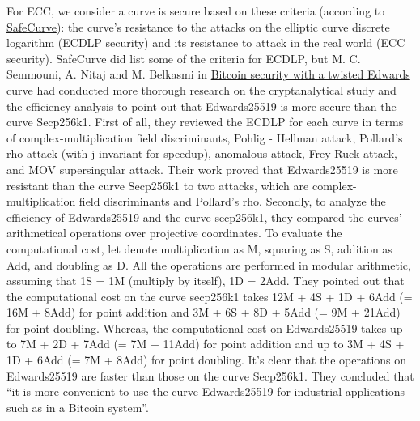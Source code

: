For ECC, we consider a curve is secure based on these criteria (according to \href{http://safecurves.cr.yp.to/index.html}{SafeCurve}):  the curve’s resistance to the attacks on the elliptic curve discrete logarithm (ECDLP security) and its resistance to attack in the real world (ECC security). SafeCurve did list some of the criteria for ECDLP, but M. C. Semmouni, A. Nitaj and M. Belkasmi in \href{https://sci-hub.se/10.1080/09720529.2019.1681673}{Bitcoin security with a twisted Edwards curve} had conducted more thorough research on the cryptanalytical study and the efficiency analysis to point out that Edwards25519 is more secure than the curve Secp256k1. First of all, they reviewed the ECDLP for each curve in terms of complex-multiplication field discriminants, Pohlig - Hellman attack, Pollard’s rho attack (with j-invariant for speedup), anomalous attack, Frey-Ruck attack, and MOV supersingular attack. Their work proved that Edwards25519 is more resistant than the curve Secp256k1 to two attacks, which are complex-multiplication field discriminants and Pollard’s rho. Secondly, to analyze the efficiency of Edwards25519 and the curve secp256k1, they compared the curves’ arithmetical operations over projective coordinates. To evaluate the computational cost, let denote multiplication as M, squaring as S, addition as Add, and doubling as D. All the operations are performed in modular arithmetic, assuming that 1S = 1M (multiply by itself), 1D = 2Add. They pointed out that the computational cost on the curve secp256k1 takes 12M + 4S + 1D + 6Add (= 16M + 8Add) for point addition and 3M + 6S + 8D + 5Add (= 9M + 21Add) for point doubling. Whereas, the computational cost on Edwards25519 takes up to 7M + 2D + 7Add (= 7M + 11Add) for point addition and up to 3M + 4S + 1D + 6Add (= 7M + 8Add) for point doubling. It’s clear that the operations on Edwards25519 are faster than those on the curve Secp256k1. They concluded that “it is more convenient to use the curve Edwards25519 for industrial applications such as in a Bitcoin system”.\\

\vspace{0.5cm}

